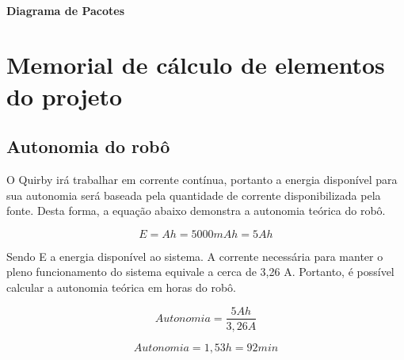 \subsubsection{Diagrama de Pacotes}
\label{sec:DiagramaPacotes}


\chapter{Memorial de cálculo de elementos do projeto}
\section{Autonomia do robô}
O Quirby irá trabalhar em corrente contínua, portanto a energia disponível para sua autonomia será baseada pela quantidade de corrente disponibilizada pela fonte. Desta forma, a equação abaixo demonstra a autonomia teórica do robô.

\begin{equation}
E = Ah = 5000 mAh = 5 Ah
\end{equation}

Sendo E a energia disponível ao sistema. 
A corrente necessária para manter o pleno funcionamento do sistema equivale a cerca de 3,26 A. Portanto, é possível calcular a autonomia teórica em horas do robô.

\begin{equation}
    Autonomia = \frac{5 Ah}{3,26 A}
\end{equation}

\begin{equation}
    Autonomia = 1,53 h = 92 min
\end{equation}

